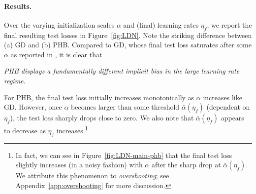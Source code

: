 \paragraph{Results.}
Over the varying initialization scales $\alpha$ and (final) learning rates $\eta_f$, we report the final resulting test losses in Figure~\ref{fig:LDN}.
Note the striking difference between (a) GD and (b) PHB.
Compared to GD, whose final test loss saturates after some $\alpha$ as reported in \citet{nacson2022stepsize}, it is clear that
\begin{center}
    {\it PHB displays a fundamentally different implicit bias in the large learning rate regime.}
\end{center}
For PHB, the final test loss initially increases monotonically as $\alpha$ increases like GD. However, once $\alpha$ becomes larger than some threshold $\bar{\alpha}(\eta_f)$ (dependent on $\eta_f$), the test loss sharply drops close to zero.
We also note that $\bar{\alpha}(\eta_f)$ appears to decrease as $\eta_f$ increases.\footnote{In fact, we can see in Figure~\ref{fig:LDN-main-phb} that the final test loss slightly increases (in a noisy fashion) with $\alpha$ after the sharp drop at $\bar \alpha(\eta_f)$. We attribute this phenomenon to \emph{overshooting}; see Appendix~\ref{app:overshooting} for more discussion.}




